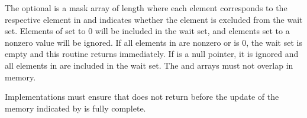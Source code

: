 \begin{apidefinition}
{    The optional  is a mask array of length  where each
    element corresponds to the respective element in  and indicates
    whether the element is excluded from the wait set.  Elements of
     set to 0 will be included in the wait set, and elements set to
    a nonzero value will be ignored.  If all elements in  are nonzero or
     is 0, the wait set is empty and this routine returns
    immediately.  If  is a null pointer, it is ignored and all
    elements in  are included in the wait set.  The  and
     arrays must not overlap in memory.

    Implementations must ensure that 
    does not return before the update of the memory indicated by  is
    fully complete.
}




\end{apidefinition}

